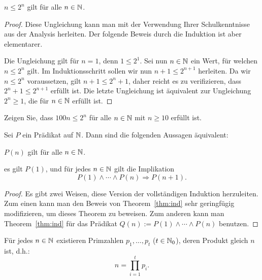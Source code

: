 \begin{thm}
	$n \le 2^n$ gilt für alle $n \in \mathbb{N}$. 
\end{thm} 
\begin{proof} 
	Diese Ungleichung kann man mit der Verwendung Ihrer Schulkenntnisse aus der Analysis herleiten. Der folgende Beweis durch die Induktion ist aber elementarer. 
	
	Die Ungleichung gilt für $n=1$, denn $1 \le 2^1$. Sei nun $n \in \mathbb{N}$ ein Wert, für welchen $n \le 2^n$ gilt. Im Induktionsschritt sollen wir nun $n + 1 \le 2^{n+1}$ herleiten. Da wir $n \le 2^n$ voraussetzen, gilt $n+1 \le 2^n + 1$, daher reicht es zu verifizieren, dass $2^n + 1 \le 2^{n+1}$ erfüllt ist. Die letzte Ungleichung ist äquivalent zur Ungleichung $2^n \ge 1$, die für $n \in \mathbb{N}$ erfüllt ist. 
\end{proof} 

\begin{aufg} 
	Zeigen Sie, dass $100 n \le 2^n$ für alle $n \in \mathbb{N}$ mit $n \ge 10$ erfüllt ist. 
\end{aufg} 


\begin{thm}
	\label{thm:ind:ver2}
	Sei $P$ ein Prädikat auf  $\mathbb{N}$. Dann sind die folgenden Aussagen äquivalent: 
	\begin{enuma}
			\item $P(n)$ gilt für alle $n \in \mathbb{N}$. 
			\item es gilt $P(1)$, und für jedes $n \in \mathbb{N}$ gilt die Implikation 
			\[
				P(1) \wedge \cdots \wedge P(n)  \Rightarrow P(n+1).
			\] 
	\end{enuma} 
\end{thm} 
\begin{proof} 
	Es gibt zwei Weisen, diese Version der vollständigen Induktion herzuleiten. Zum einen kann man den Beweis von Theorem~\ref{thm:ind} sehr geringfügig modifizieren, um dieses Theorem zu beweisen. Zum anderen kann man Theorem~\ref{thm:ind} für das Prädikat $Q(n) := P(1) \wedge \cdots \wedge P(n)$ benutzen. 
\end{proof} 

\begin{thm}
	\label{thm:primfakt-ex}
	Für jedes $n \in \mathbb{N}$ existieren  Primzahlen $p_1,\ldots,p_t$ ($t \in \mathbb{N}_0$), deren Produkt gleich $n$ ist, d.h.:  
	\[
		n = \prod_{i=1}^t p_i.
	\] 
\end{thm} 

